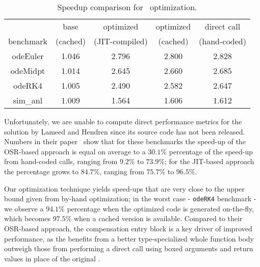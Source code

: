 \begin{table}
    \begin{tabular}{ |c|c|c|c|c| }
        \hline
         & base & optimized & optimized & direct call \\ 
        benchmark & (cached) & (JIT-compiled) & (cached) & (hand-coded) \\
        \hline
        \hline
        odeEuler & 1.046 & 2.796 & 2.800 & 2.828 \\ 
        \hline
        odeMidpt & 1.014 & 2.645 & 2.660 & 2.685 \\ 
        \hline
        odeRK4 & 1.005 & 2.490 & 2.582 & 2.647 \\ 
        \hline
        sim\_anl & 1.009 & 1.564 & 1.606 & 1.612 \\ 
        \hline
    \end{tabular} 
    \caption{\label{tab:feval} Speedup comparison for \feval\ optimization.} 
\end{table}  
  
Unfortunately, we are unable to compute direct performance metrics for the solution by Lameed and Hendren since its source code has not been released. Numbers in their paper~\cite{lameed2013feval} show that for these benchmarks the speed-up of the OSR-based approach is equal on average to a $30.1\%$ percentage of the speed-up from hand-coded calls, ranging from $9.2\%$ to $73.9\%$; for the JIT-based approach the percentage grows to $84.7\%$, ranging from $75.7\%$ to $96.5\%$.

Our optimization technique yields speed-ups that are very close to the upper bound given from by-hand optimization; in the worst case - {\tt odeRK4} benchmark - we observe a $94.1\%$ percentage when the optimized code is generated on-the-fly, which becomes $97.5\%$ when a cached version is available. Compared to their OSR-based approach, the compensation entry block is a key driver of improved performance, as the benefits from a better type-specialized whole function body outweigh those from performing a direct call using boxed arguments and return values in place of the original \feval.
  
  
  
  
  
  
  
  
  